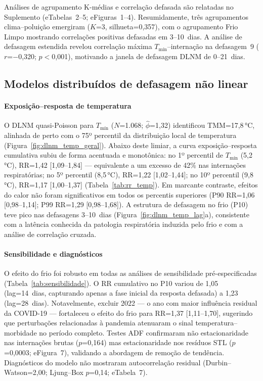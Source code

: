 \documentclass[12pt]{article}
\begin{document}
Análises de agrupamento K-médias e correlação defasada são relatadas
no Suplemento (eTabelas~2--5; eFiguras~1--4). Resumidamente, três
agrupamentos clima--poluição emergiram ($K$=3, silhueta=0,357), com
o agrupamento Frio Limpo mostrando correlações positivas defasadas em
3--10~dias. A análise de defasagem estendida revelou correlação máxima
$T_\mathrm{mín}$--internação na defasagem~9 ($r$=$-$0,320;
$p<$0,001), motivando a janela de defasagem DLNM de 0--21~dias.

\subsection{Modelos distribuídos de defasagem não linear}

\paragraph{Exposição--resposta de temperatura}
O DLNM quasi-Poisson para $T_\mathrm{mín}$ ($N$=1.068;
$\hat{\phi}$=1,32) identificou TMM=17,8\,°C, alinhada de perto com
o 75º percentil da distribuição local de temperatura
(Figura~\ref{fig:dlnm_temp_geral}). Abaixo deste limiar, a curva
exposição--resposta cumulativa subiu de forma acentuada e monotônica:
no 1º percentil de $T_\mathrm{mín}$ (5,2\,°C), RR=1,42 [1,09--1,84]
--- equivalente a um excesso de 42\% nas internações respiratórias;
no 5º percentil (8,5\,°C), RR=1,22 [1,02--1,44]; no 10º percentil
(9,8\,°C), RR=1,17 [1,00--1,37] (Tabela~\ref{tab:rr_temp}). Em
marcante contraste, efeitos do calor não foram significativos em
todos os percentis superiores (P90 RR=1,06 [0,98--1,14]; P99 RR=1,29
[0,98--1,68]). A estrutura de defasagem no frio (P10) teve pico nas
defasagens 3--10~dias (Figura~\ref{fig:dlnm_temp_lag}a), consistente
com a latência conhecida da patologia respiratória induzida pelo frio
e com a análise de correlação cruzada.

\paragraph{Sensibilidade e diagnósticos}
O efeito do frio foi robusto em todas as análises de sensibilidade
pré-especificadas (Tabela~\ref{tab:sensibilidade}). O RR cumulativo
no P10 variou de 1,05 (lag=14~dias, capturando apenas a fase inicial
da resposta defasada) a 1,23 (lag=28~dias). Notavelmente, excluir
2022 --- o ano com maior influência residual da COVID-19 ---
fortaleceu o efeito do frio para RR=1,37 [1,11--1,70], sugerindo que
perturbações relacionadas à pandemia atenuaram o sinal
temperatura--morbidade no período completo. Testes ADF confirmaram não
estacionaridade nas internações brutas ($p$=0,164) mas
estacionaridade nos resíduos STL ($p$=0,0003; eFigura~7), validando a
abordagem de remoção de tendência. Diagnósticos do modelo não
mostraram autocorrelação residual (Durbin--Watson=2,00; Ljung--Box
$p$=0,14; eTabela~7).
\end{document}
